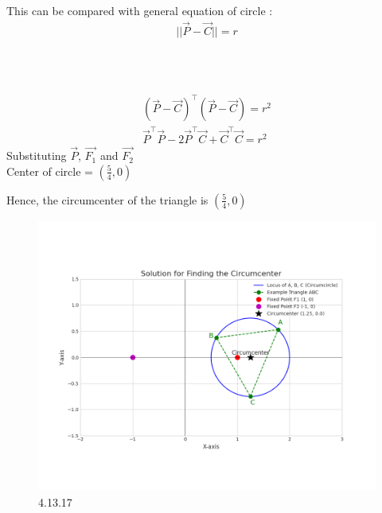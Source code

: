 \documentclass[journal]{IEEEtran}
\begin{document}
This can be compared with general equation of circle :
\begin{align}
||\vec{P} - \vec{C}|| = r\\
\end{align}
\\
\\
\\
\begin{align}
(\vec{P}-\vec{C})^\top(\vec{P}-\vec{C}) = r^2\\
\vec{P}^\top\vec{P} -2\vec{P}^\top\vec{C}+\vec{C}^\top\vec{C}=r^2
\end{align}
Substituting $\Vec{P}$, $\vec{F_1}$ and $\vec{F_2}$\\
Center of circle =  $\left(\frac{5}{4}, 0\right)$

Hence, the circumcenter of the triangle is $\left(\frac{5}{4}, 0\right)$
\begin{figure}[H]
    \centering
    \includegraphics[width=0.85\columnwidth]{figs/graph9.png}
    \caption{4.13.17}
    \label{fig:placeholder}
\end{figure}
\end{document}
